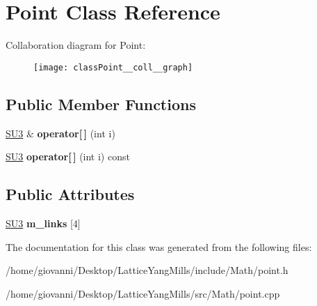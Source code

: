 \hypertarget{classPoint}{}\section{Point Class Reference}
\label{classPoint}


Collaboration diagram for Point\+:\nopagebreak
\begin{figure}[H]
\begin{center}
\leavevmode
\texttt{[image: classPoint\_\_coll\_\_graph]}
\end{center}
\end{figure}
\subsection*{Public Member Functions}
\begin{DoxyCompactItemize}
\item 
\hyperlink{structSU3}{S\+U3} \& {\bfseries operator\mbox{[}$\,$\mbox{]}} (int i)\hypertarget{classPoint_a6fcc34716fa91deb2b6ddf462d96430d}{}\label{classPoint_a6fcc34716fa91deb2b6ddf462d96430d}

\item 
\hyperlink{structSU3}{S\+U3} {\bfseries operator\mbox{[}$\,$\mbox{]}} (int i) const \hypertarget{classPoint_abb419464d0a881856261041f3b9a779e}{}\label{classPoint_abb419464d0a881856261041f3b9a779e}

\end{DoxyCompactItemize}
\subsection*{Public Attributes}
\begin{DoxyCompactItemize}
\item 
\hyperlink{structSU3}{S\+U3} {\bfseries m\+\_\+links} \mbox{[}4\mbox{]}\hypertarget{classPoint_a9b2d9b03add6fedff7e4e9369c6871b9}{}\label{classPoint_a9b2d9b03add6fedff7e4e9369c6871b9}

\end{DoxyCompactItemize}


The documentation for this class was generated from the following files\+:\begin{DoxyCompactItemize}
\item 
/home/giovanni/\+Desktop/\+Lattice\+Yang\+Mills/include/\+Math/point.\+h\item 
/home/giovanni/\+Desktop/\+Lattice\+Yang\+Mills/src/\+Math/point.\+cpp\end{DoxyCompactItemize}
